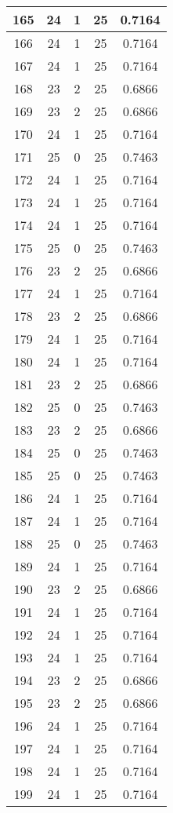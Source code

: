 \documentclass[letterpaper, 12pt]{article}
\begin{document}
\begin{longtable}{|c|c|c|c|c|}
\hline
165 & 24 & 1 & 25 & 0.7164 \\
\hline
166 & 24 & 1 & 25 & 0.7164 \\
\hline
167 & 24 & 1 & 25 & 0.7164 \\
\hline
168 & 23 & 2 & 25 & 0.6866 \\
\hline
169 & 23 & 2 & 25 & 0.6866 \\
\hline
170 & 24 & 1 & 25 & 0.7164 \\
\hline
171 & 25 & 0 & 25 & 0.7463 \\
\hline
172 & 24 & 1 & 25 & 0.7164 \\
\hline
173 & 24 & 1 & 25 & 0.7164 \\
\hline
174 & 24 & 1 & 25 & 0.7164 \\
\hline
175 & 25 & 0 & 25 & 0.7463 \\
\hline
176 & 23 & 2 & 25 & 0.6866 \\
\hline
177 & 24 & 1 & 25 & 0.7164 \\
\hline
178 & 23 & 2 & 25 & 0.6866 \\
\hline
179 & 24 & 1 & 25 & 0.7164 \\
\hline
180 & 24 & 1 & 25 & 0.7164 \\
\hline
181 & 23 & 2 & 25 & 0.6866 \\
\hline
182 & 25 & 0 & 25 & 0.7463 \\
\hline
183 & 23 & 2 & 25 & 0.6866 \\
\hline
184 & 25 & 0 & 25 & 0.7463 \\
\hline
185 & 25 & 0 & 25 & 0.7463 \\
\hline
186 & 24 & 1 & 25 & 0.7164 \\
\hline
187 & 24 & 1 & 25 & 0.7164 \\
\hline
188 & 25 & 0 & 25 & 0.7463 \\
\hline
189 & 24 & 1 & 25 & 0.7164 \\
\hline
190 & 23 & 2 & 25 & 0.6866 \\
\hline
191 & 24 & 1 & 25 & 0.7164 \\
\hline
192 & 24 & 1 & 25 & 0.7164 \\
\hline
193 & 24 & 1 & 25 & 0.7164 \\
\hline
194 & 23 & 2 & 25 & 0.6866 \\
\hline
195 & 23 & 2 & 25 & 0.6866 \\
\hline
196 & 24 & 1 & 25 & 0.7164 \\
\hline
197 & 24 & 1 & 25 & 0.7164 \\
\hline
198 & 24 & 1 & 25 & 0.7164 \\
\hline
199 & 24 & 1 & 25 & 0.7164 \\
\hline
\end{longtable}
\end{document}
